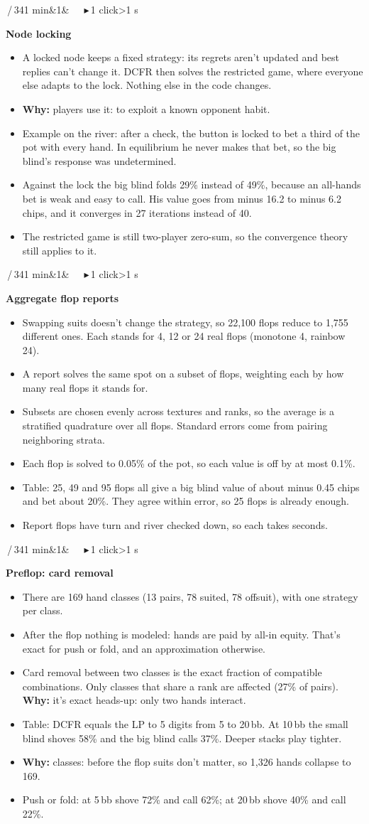 \documentclass{article}
\newcommand{\slide}[4]{\clearpage
  \noindent\colorbox{bar}{\parbox{\dimexpr\linewidth-2\fboxsep}{\color{white}\fontsize{13}{15}\selectfont
  \textbf{\fontsize{21}{23}\selectfont #1}\,/\,34\hfill #3\ifx&#4&\else\ \ \ \textcolor{ck!40!white}{\ensuremath{\blacktriangleright}}\,#4 click\ifnum#4>1 s\fi\fi\\[2pt]
  \raggedright\textbf{\fontsize{15}{17.5}\selectfont #2}}}\par\vspace{5pt}
  \fontsize{15}{17.8}\selectfont\raggedright}
\newcommand{\pt}{\item[\textbullet]}
\newcommand{\ck}{\item[\textcolor{ck}{\ensuremath{\blacktriangleright}}]}
\newcommand{\why}{\textcolor{why}{\textbf{Why:}} }
\begin{document}
\slide{25}{Node locking}{1 min}{1}
\begin{itemize}
\pt A locked node keeps a fixed strategy: its regrets aren't updated and best replies can't change it. DCFR then solves the restricted game, where everyone else adapts to the lock. Nothing else in the code changes.
\pt \why players use it: to exploit a known opponent habit.
\ck Example on the river: after a check, the button is locked to bet a third of the pot with every hand. In equilibrium he never makes that bet, so the big blind's response was undetermined.
\pt Against the lock the big blind folds 29\% instead of 49\%, because an all-hands bet is weak and easy to call. His value goes from minus 16.2 to minus 6.2 chips, and it converges in 27 iterations instead of 40.
\pt The restricted game is still two-player zero-sum, so the convergence theory still applies to it.
\end{itemize}

\slide{26}{Aggregate flop reports}{1 min}{1}
\begin{itemize}
\pt Swapping suits doesn't change the strategy, so 22,100 flops reduce to 1,755 different ones. Each stands for 4, 12 or 24 real flops (monotone 4, rainbow 24).
\ck A report solves the same spot on a subset of flops, weighting each by how many real flops it stands for.
\pt Subsets are chosen evenly across textures and ranks, so the average is a stratified quadrature over all flops. Standard errors come from pairing neighboring strata.
\pt Each flop is solved to 0.05\% of the pot, so each value is off by at most 0.1\%.
\pt Table: 25, 49 and 95 flops all give a big blind value of about minus 0.45 chips and bet about 20\%. They agree within error, so 25 flops is already enough.
\pt Report flops have turn and river checked down, so each takes seconds.
\end{itemize}

\slide{27}{Preflop: card removal}{1 min}{1}
\begin{itemize}
\pt There are 169 hand classes (13 pairs, 78 suited, 78 offsuit), with one strategy per class.
\pt After the flop nothing is modeled: hands are paid by all-in equity. That's exact for push or fold, and an approximation otherwise.
\pt Card removal between two classes is the exact fraction of compatible combinations. Only classes that share a rank are affected (27\% of pairs). \why it's exact heads-up: only two hands interact.
\ck Table: DCFR equals the LP to 5 digits from 5 to 20\,bb. At 10\,bb the small blind shoves 58\% and the big blind calls 37\%. Deeper stacks play tighter.
\pt \why classes: before the flop suits don't matter, so 1,326 hands collapse to 169.
\pt Push or fold: at 5\,bb shove 72\% and call 62\%; at 20\,bb shove 40\% and call 22\%.
\end{itemize}
\end{document}
